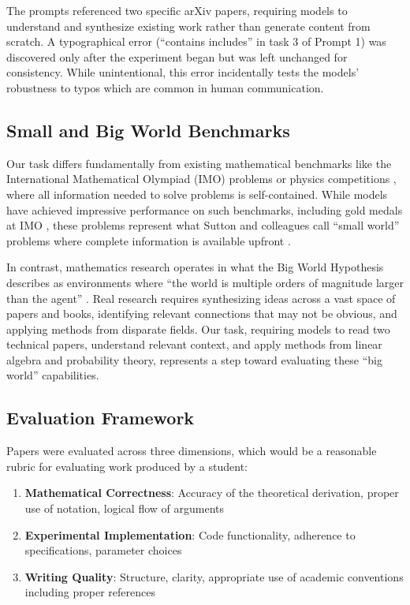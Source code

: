 \documentclass[11pt]{article}
\begin{document}
The prompts referenced two specific arXiv papers, requiring models to understand and synthesize existing work rather than generate content from scratch. A typographical error (``contains includes'' in task 3 of Prompt 1) was discovered only after the experiment began but was left unchanged for consistency. While unintentional, this error incidentally tests the models' robustness to typos which are common in human communication.

\subsection{Small and Big World Benchmarks}

Our task differs fundamentally from existing mathematical benchmarks like the International Mathematical Olympiad (IMO) problems \cite{imo2024} or physics competitions \cite{ipho2024}, where all information needed to solve problems is self-contained. While models have achieved impressive performance on such benchmarks, including gold medals at IMO \cite{deepmind2025imo,reuters2025imo}, these problems represent what Sutton and colleagues call ``small world'' problems where complete information is available upfront \cite{javed2024}.

In contrast, mathematics research operates in what the Big World Hypothesis describes as environments where ``the world is multiple orders of magnitude larger than the agent'' \cite{javed2024}. Real research requires synthesizing ideas across a vast space of papers and books, identifying relevant connections that may not be obvious, and applying methods from disparate fields. Our task, requiring models to read two technical papers, understand relevant context, and apply methods from linear algebra and probability theory, represents a step toward evaluating these ``big world'' capabilities.

\subsection{Evaluation Framework}

Papers were evaluated across three dimensions, which would be a reasonable rubric for evaluating work produced by a student:
\begin{enumerate}
    \item \textbf{Mathematical Correctness}: Accuracy of the theoretical derivation, proper use of notation, logical flow of arguments
    \item \textbf{Experimental Implementation}: Code functionality, adherence to specifications, parameter choices
    \item \textbf{Writing Quality}: Structure, clarity, appropriate use of academic conventions including proper references
\end{enumerate}
\end{document}
